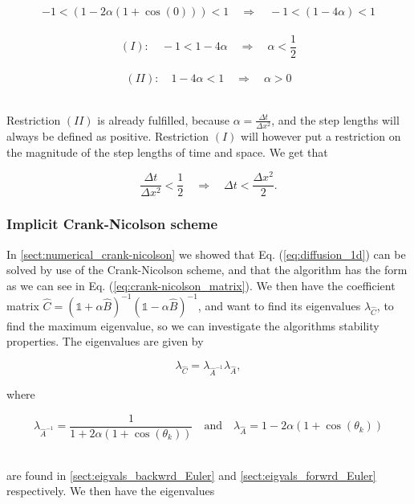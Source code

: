 \documentclass[12pt]{article}
\begin{document}
\begin{flushleft}
\vspace{5mm}
$$-1 < (1-2\alpha(1+\cos(0))) < 1 \quad\Rightarrow\quad -1 < (1-4\alpha) < 1 $$\\
$$(I):\quad -1 <1-4\alpha \quad\Rightarrow\quad \alpha < \frac{1}{2}$$\\
$$(II):\quad 1-4\alpha < 1 \quad\Rightarrow\quad \alpha > 0$$\\
\vspace{5mm} 

Restriction $(II)$ is already fulfilled, because $\alpha = \frac{\Delta t}{\Delta x^2}$, and the step lengths will always be defined as positive. Restriction $(I)$ will however put a restriction on the magnitude of the step lengths of time and space. We get that

\vspace{5mm}
\begin{equation}\label{eq:restriction_bkwrd_Euler}
\frac{\Delta t}{\Delta x^2} <\frac{1}{2} \quad\Rightarrow\quad \Delta t < \frac{\Delta x^2}{2}.
\end{equation}
\vspace{5mm}

\subsubsection{Implicit Crank-Nicolson scheme\label{sect:eigvals_Crank-Nicolson}}
In \ref{sect:numerical_crank-nicolson} we showed that Eq. (\ref{eq:diffusion_1d}) can be solved by use of the Crank-Nicolson scheme, and that the algorithm has the form as we can see in Eq. (\ref{eq:crank-nicolson_matrix}). We then have the coefficient matrix $\hat{C} = (\mathbb{1} + \alpha\hat{B})^{-1}(\mathbb{1} - \alpha\hat{B})^{-1}$, and want to find its eigenvalues $\lambda_{\hat{C}}$, to find the maximum eigenvalue, so we can investigate the algorithms stability properties. The eigenvalues are given by

\vspace{5mm}
\begin{equation}\label{eq:bkwrd_Euler_eigenvalues_A}
\lambda_{\hat{C}} = \lambda_{\hat{A}^{-1}}\lambda_{\hat{A}},
\end{equation}

where 

$$\lambda_{\hat{A}^{-1}} = \frac{1}{1+2\alpha(1+\cos(\theta_k))}\quad\text{and}\quad \lambda_{\hat{A}} = 1-2\alpha(1+\cos(\theta_k))$$\\
\vspace{5mm}

are found in \ref{sect:eigvals_backwrd_Euler} and \ref{sect:eigvals_forwrd_Euler} respectively. We then have the eigenvalues


\end{flushleft}
\end{document}
